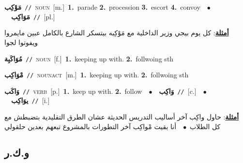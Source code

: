 \documentclass[10pt,a4paper,twoside]{article} %
\begin{document}
\begin{multicols}{2}
{\setlength\topsep{0pt}\textbf{\foreignlanguage{arabic}{مَوْكِب}}\ {\color{gray}\texttt{//}\color{black}}\ \textsc{noun}\ [m.]\ \textbf{1.}~parade  \textbf{2.}~procession  \textbf{3.}~escort  \textbf{4.}~convoy\ \ $\bullet$\ \ \setlength\topsep{0pt}\textbf{\foreignlanguage{arabic}{مَوَاكِب}}\ {\color{gray}\texttt{//}\color{black}}\ [pl.]\  \begin{flushright}\color{gray}\foreignlanguage{arabic}{\textbf{\underline{\foreignlanguage{arabic}{أمثلة}}}: كل يوم بيجي وزير الداخلية مع مَوْكِبه بيتسكر الشارع بالكامل عبين مايمروا ويفوتوا لجوا}\end{flushright}\color{black}} \vspace{2mm}

{\setlength\topsep{0pt}\textbf{\foreignlanguage{arabic}{مُوَاكَبِة}}\ {\color{gray}\texttt{//}\color{black}}\ \textsc{noun}\ [f.]\ \textbf{1.}~keeping up with.  \textbf{2.}~follwoing sth\ } \vspace{2mm}

{\setlength\topsep{0pt}\textbf{\foreignlanguage{arabic}{مْوَاكِب}}\ {\color{gray}\texttt{//}\color{black}}\ \textsc{noun\textunderscore act}\ [m.]\ \textbf{1.}~keeping up with.  \textbf{2.}~follwoing sth\ } \vspace{2mm}

{\setlength\topsep{0pt}\textbf{\foreignlanguage{arabic}{وَاكَب}}\ {\color{gray}\texttt{//}\color{black}}\ \textsc{verb}\ [p.]\ \textbf{1.}~keep up with.  \textbf{2.}~follow\ \ $\bullet$\ \ \setlength\topsep{0pt}\textbf{\foreignlanguage{arabic}{وَاكِب}}\ {\color{gray}\texttt{//}\color{black}}\ [c.]\ \ $\bullet$\ \ \setlength\topsep{0pt}\textbf{\foreignlanguage{arabic}{يوَاكِب}}\ {\color{gray}\texttt{//}\color{black}}\ [i.]\  \begin{flushright}\color{gray}\foreignlanguage{arabic}{\textbf{\underline{\foreignlanguage{arabic}{أمثلة}}}: حاول واكِب آخر أساليب التدريس الحديثة عشان الطرق التقليدية بتضبطش مع كل الطلاب\ $\bullet$\ \  أنا بقيت مْواكِب آخر التطورات بالمشروع تبعهم بعدين حلقولي}\end{flushright}\color{black}} \vspace{2mm}

\vspace{-3mm}
\subsection*{\color{blue}\foreignlanguage{arabic}{و.ك.ر}\color{blue}{}} 


\end{multicols}
\end{document}
